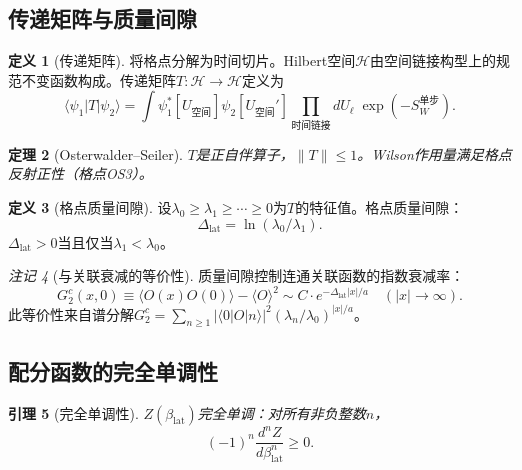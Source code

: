 \documentclass[12pt,a4paper]{article}
\theoremstyle{plain}
\newtheorem{theorem}{定理}[section]
\newtheorem{lemma}[theorem]{引理}
\theoremstyle{definition}
\newtheorem{definition}[theorem]{定义}
\theoremstyle{remark}
\newtheorem{remark}[theorem]{注记}
\begin{document}
\subsection{传递矩阵与质量间隙}\label{sec:transfer}

\begin{definition}[传递矩阵]\label{def:transfer}
将格点分解为时间切片。Hilbert空间$\mathcal{H}$由空间链接构型上的规范不变函数构成。传递矩阵$T:\mathcal{H}\to\mathcal{H}$定义为
\begin{equation}
\langle\psi_1|T|\psi_2\rangle = \int \psi_1^*[U_{\text{空间}}]\psi_2[U_{\text{空间}}']\prod_{\text{时间链接}}dU_\ell\;\exp(-S_W^{\text{单步}}).
\end{equation}
\end{definition}

\begin{theorem}[Osterwalder--Seiler\cite{OsterwalderSeiler1978}]\label{thm:OS}
$T$是正自伴算子，$\|T\|\leq 1$。Wilson作用量满足格点反射正性（格点OS3）。
\end{theorem}

\begin{definition}[格点质量间隙]\label{def:gap}
设$\lambda_0\geq\lambda_1\geq\cdots\geq 0$为$T$的特征值。格点质量间隙：
\begin{equation}\label{eq:gapdef}
\Delta_{\mathrm{lat}} = \ln(\lambda_0/\lambda_1).
\end{equation}
$\Delta_{\mathrm{lat}}>0$当且仅当$\lambda_1<\lambda_0$。
\end{definition}

\begin{remark}[与关联衰减的等价性]
质量间隙控制连通关联函数的指数衰减率：
\begin{equation}\label{eq:expdecay}
G_2^c(x,0) \equiv \langle O(x)O(0)\rangle - \langle O\rangle^2 \sim C\cdot e^{-\Delta_{\mathrm{lat}}|x|/a} \quad (|x|\to\infty).
\end{equation}
此等价性来自谱分解$G_2^c=\sum_{n\geq 1}|\langle 0|O|n\rangle|^2(\lambda_n/\lambda_0)^{|x|/a}$。
\end{remark}

\subsection{配分函数的完全单调性}\label{sec:cm}

\begin{lemma}[完全单调性]\label{lem:cm}
$Z(\beta_{\mathrm{lat}})$完全单调：对所有非负整数$n$，
\begin{equation}\label{eq:cm}
(-1)^n \frac{d^nZ}{d\beta_{\mathrm{lat}}^n} \geq 0.
\end{equation}
\end{lemma}
\end{document}
